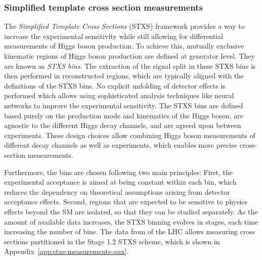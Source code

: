 
\subsubsection{Simplified template cross section measurements}
The \emph{Simplified Template Cross Sections} (STXS) framework provides a way to increase the experimental sensitivity while still allowing for differential measurements of Higgs boson production.
To achieve this, mutually exclusive kinematic regions of Higgs boson production are defined at generator level. They are known as \emph{STXS bins}. 
The extraction of the signal split in these STXS bins is then performed in reconstructed regions, which are typically aligned with the definitions of the STXS bins. No explicit unfolding of detector effects is performed which allows using sophisticated analysis techniques like neural networks to improve the experimental sensitivity.
The STXS bins are defined based purely on the production mode and kinematics of the Higgs boson, are agnostic to the different Higgs decay channels, and are agreed upon between experiments.
These design choices allow combining Higgs boson measurements of different decay channels as well as experiments, which enables more precise cross-section measurements.

Furthermore, the bins are chosen following two main principles: First, the experimental acceptance is aimed at being constant within each bin, which reduces the dependency on theoretical assumptions arising from detector acceptance effects. Second, regions that are expected to be sensitive to physics effects beyond the SM are isolated, so that they can be studied separately.
As the amount of available data increases, the STXS binning evolves in stages, each time increasing the number of bins. 
The data from \RunTwo of the LHC allows measuring cross sections partitioned in the Stage 1.2 STXS scheme, which is shown in Appendix~\ref{app:stxs-measurements-aux}.

